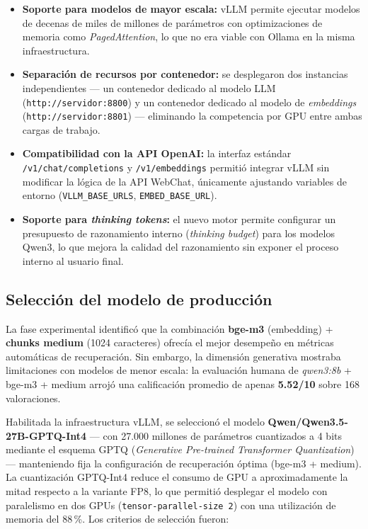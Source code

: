 \begin{itemize}
  \item \textbf{Soporte para modelos de mayor escala:} vLLM permite ejecutar modelos de decenas de miles de millones de parámetros con optimizaciones de memoria como \textit{PagedAttention}, lo que no era viable con Ollama en la misma infraestructura.
  \item \textbf{Separación de recursos por contenedor:} se desplegaron dos instancias independientes — un contenedor dedicado al modelo LLM (\texttt{http://servidor:8800}) y un contenedor dedicado al modelo de \textit{embeddings} (\texttt{http://servidor:8801}) — eliminando la competencia por GPU entre ambas cargas de trabajo.
  \item \textbf{Compatibilidad con la API OpenAI:} la interfaz estándar \texttt{/v1/chat/completions} y \texttt{/v1/embeddings} permitió integrar vLLM sin modificar la lógica de la API WebChat, únicamente ajustando variables de entorno (\texttt{VLLM\_BASE\_URLS}, \texttt{EMBED\_BASE\_URL}).
  \item \textbf{Soporte para \textit{thinking tokens}:} el nuevo motor permite configurar un presupuesto de razonamiento interno (\textit{thinking budget}) para los modelos Qwen3, lo que mejora la calidad del razonamiento sin exponer el proceso interno al usuario final.
\end{itemize}

\subsection{Selección del modelo de producción}\label{sec:seleccion_modelo}

La fase experimental identificó que la combinación \textbf{bge-m3} (embedding) + \textbf{chunks medium} (1024 caracteres) ofrecía el mejor desempeño en métricas automáticas de recuperación. Sin embargo, la dimensión generativa mostraba limitaciones con modelos de menor escala: la evaluación humana de \textit{qwen3:8b} + bge-m3 + medium arrojó una calificación promedio de apenas \textbf{5.52/10} sobre 168 valoraciones.

Habilitada la infraestructura vLLM, se seleccionó el modelo \textbf{Qwen/Qwen3.5-27B-GPTQ-Int4} — con 27.000 millones de parámetros cuantizados a 4 bits mediante el esquema GPTQ (\textit{Generative Pre-trained Transformer Quantization}) — manteniendo fija la configuración de recuperación óptima (bge-m3 + medium). La cuantización GPTQ-Int4 reduce el consumo de GPU a aproximadamente la mitad respecto a la variante FP8, lo que permitió desplegar el modelo con paralelismo en dos GPUs (\texttt{tensor-parallel-size 2}) con una utilización de memoria del 88\,\%. Los criterios de selección fueron:

